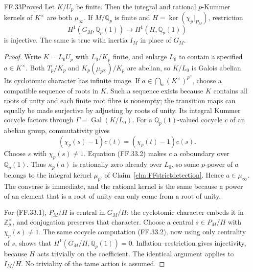 \begin{claim}{FF.33}{Proved}\label{clm:FFcyclotomiccohomology}
Let \(K/U_p\) be finite. Then the integral and
rational \(p\)-Kummer kernels of \(K^\times\)
are both \(\mu_\infty\). If \(M/\mathbb Q_p\)
is finite and
\(H=\ker(\chi_p|_{P_M})\), restriction
\[
 H^1(G_M,\mathbb Q_p(1))\longrightarrow
                  H^1(H,\mathbb Q_p(1))
                                                        \tag{FF.33.1}
\]
is injective. The same is true with inertia
\(I_M\) in place of \(G_M\).
\end{claim}
\begin{proof}
Write \(K=L_0U_p\) with \(L_0/K_p\) finite,
and enlarge \(L_0\) to contain a specified
\(a\in K^\times\). Both \(T_p/K_p\) and
\(K_p(\mu_{p^\infty})/K_p\) are abelian, so
\(K/L_0\) is Galois abelian. Its cyclotomic
character has infinite image.
If \(a\in\bigcap_n(K^\times)^{p^n}\), choose
a compatible sequence of roots in \(K\).
Such a sequence exists because \(K\) contains
all roots of unity and each finite root fibre
is nonempty; the transition maps can equally
be made surjective by adjusting by roots of
unity. Its integral Kummer cocycle factors
through \(\Gamma=\operatorname{Gal}(K/L_0)\).
For a \(\mathbb Q_p(1)\)-valued cocycle \(c\)
of an abelian group, commutativity gives
\[
 (\chi_p(s)-1)c(t)=(\chi_p(t)-1)c(s).
                                                        \tag{FF.33.2}
\]
Choose \(s\) with \(\chi_p(s)\ne1\). Equation
(FF.33.2) makes \(c\) a coboundary over
\(\mathbb Q_p(1)\). Thus \(\kappa_p(a)\)
is rationally zero already over \(L_0\), so
some \(p\)-power of \(a\) belongs to the
integral kernel \(\mu_{p'}\) of
Claim~\ref{clm:FFstrictdetection}. Hence
\(a\in\mu_\infty\). The converse is immediate,
and the rational kernel is the same because
a power of an element that is a root of unity
can only come from a root of unity.

For (FF.33.1), \(P_M/H\) is central in
\(G_M/H\): the cyclotomic character embeds
it in \(\mathbb Z_p^\times\), and conjugation
preserves that character. Choose a central
\(s\in P_M/H\) with \(\chi_p(s)\ne1\).
The same cocycle computation (FF.33.2), now
using only centrality of \(s\), shows that
\(H^1(G_M/H,\mathbb Q_p(1))=0\).
Inflation--restriction gives injectivity,
because \(H\) acts trivially on the coefficient.
The identical argument applies to \(I_M/H\).
No triviality of the tame action is assumed.
\end{proof}


